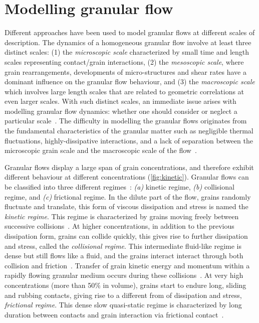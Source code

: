 \section{Modelling granular flow}

Different approaches have been used to model granular flows at different 
scales of description. The dynamics of a homogeneous granular flow involve at 
least three distinct scales: (1) the \textit{microscopic scale} characterized 
by small time and length scales representing contact/grain interactions, (2) 
the \textit{mesoscopic scale}, where grain rearrangements, developments of 
micro-structures and shear rates have a dominant influence on the granular flow 
behaviour, and (3) the \textit{macroscopic scale} which involves large length 
scales that are related to geometric correlations at even larger scales. With 
such distinct scales, an immediate issue arises with modelling granular flow 
dynamics: whether one should consider or neglect a particular 
scale~\citep{Radjai2009}. The difficulty in modelling the granular flows 
originates from the fundamental characteristics of the granular matter such as 
negligible thermal fluctuations, highly-dissipative interactions, and a lack of 
separation between the microscopic grain scale and the macroscopic scale of the 
flow~\citep{Goldhirsch2003}. 


Granular flows display a large span of grain concentrations, and therefore 
exhibit different behaviour at different concentrations (\cref{fig:kinetic}). 
Granular flows can be classified into three different 
regimes~\citep{Jaeger1996}: \textit{(a)} kinetic regime, \textit{(b)} 
collisional regime, and \textit{(c)} frictional regime. In the dilute part of 
the flow, grains randomly fluctuate and translate, this form of viscous 
dissipation and stress is named the \textit{kinetic regime}. This regime is 
characterized by grains moving freely between successive 
collisions~\citep{Goldhirsch2003}. At higher concentrations, in addition to the 
previous dissipation form, grains can collide quickly, this gives rise to 
further dissipation and stress, called the \textit{collisional regime}. This 
intermediate fluid-like regime is dense but still flows like a fluid, and the 
grains interact interact through both collision and 
friction~\citep{Midi2004,Pouliquen2002}. Transfer of 
grain kinetic energy and momentum within a rapidly flowing granular medium 
occurs during these collisions~\citep{Popken1999}. At very high 
concentrations (more than 50\% in volume), grains start to endure long, sliding 
and rubbing contacts, giving rise to a different from of 
dissipation and stress, \textit{frictional regime}. This dense slow 
quasi-static regime is characterized by long duration between contacts and 
grain interaction via frictional contact~\citep{Roux2002}. 


